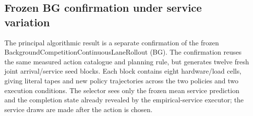 \documentclass[opre,dblanonrev]{informs4}
\begin{document}
\subsection{Frozen BG confirmation under service variation}
\label{subsec:bg-confirmation}

The principal algorithmic result is a separate confirmation of the frozen
BackgroundCompetitionContinuousLaneRollout (BG).  The confirmation reuses the
same measured action catalogue and planning rule, but generates twelve fresh
joint arrival/service seed blocks.  Each block contains eight hardware/load
cells, giving \BGConfirmationTapeCount{} literal tapes and
\BGConfirmationTrajectoryCount{} new policy trajectories across the two
policies and two execution conditions.  The selector sees only the frozen
mean service prediction and the completion state already revealed by the
empirical-service executor; the service draws are made after the action is
chosen.

\begin{table}[t]
\end{table}
\end{document}
